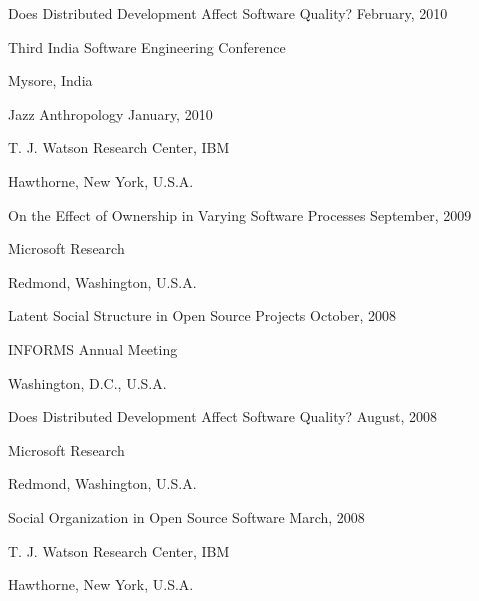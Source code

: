 \documentclass[margin,line,article,letterpaper]{res}
\newenvironment{list1}{
  \begin{list}{}{%
      \setlength{\itemsep}{0in}
      \setlength{\parsep}{0in} \setlength{\parskip}{0in}
      \setlength{\topsep}{0in} \setlength{\partopsep}{0in} 
      \setlength{\leftmargin}{0.17in}}}{\end{list}}
\newcommand{\timespan}[1]{#1}
\begin{document}
\begin{resume}
Does Distributed Development Affect Software Quality? \hfill \timespan{February, 2010}\\
\vspace{-10pt}
\begin{list1}
\item Third India Software Engineering Conference
\item Mysore, India
\end{list1}

Jazz Anthropology \hfill \timespan{January, 2010}\\
\vspace{-10pt}
\begin{list1}
\item T. J. Watson Research Center, IBM
\item Hawthorne, New York, U.S.A.
\end{list1}

On the Effect of Ownership in Varying Software Processes \hfill \timespan{September, 2009}\\
\vspace{-10pt}
\begin{list1}
\item Microsoft Research
\item Redmond, Washington, U.S.A.
\end{list1}

Latent Social Structure in Open Source Projects \hfill \timespan{October, 2008}\\
\vspace{-10pt}
\begin{list1}
\item INFORMS Annual Meeting
\item Washington, D.C., U.S.A.
\end{list1}

Does Distributed Development Affect Software Quality? \hfill \timespan{August, 2008}\\
\vspace{-10pt}
\begin{list1}
\item Microsoft Research
\item Redmond, Washington, U.S.A.
\end{list1}

Social Organization in Open Source Software \hfill \timespan{March, 2008}\\
\vspace{-10pt}
\begin{list1}
\item T. J. Watson Research Center, IBM
\item Hawthorne, New York, U.S.A.
\end{list1}


\end{resume}
\end{document}
